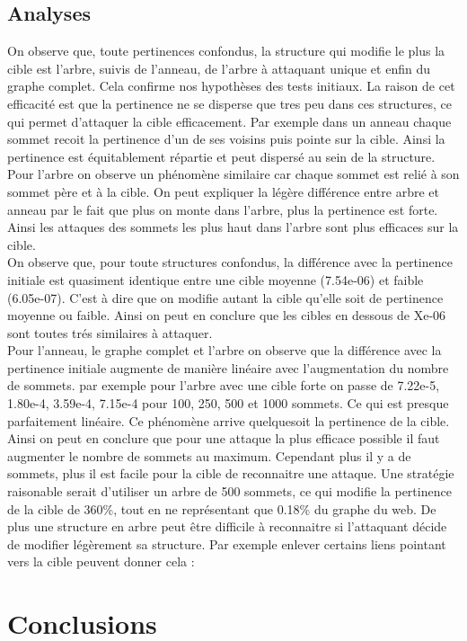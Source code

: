 \documentclass[a4paper,11pt]{article}
\begin{document}
	\subsection{Analyses}
		On observe que, toute pertinences confondus, la structure qui modifie le plus la cible est l'arbre, suivis de l'anneau, de l'arbre à attaquant unique et enfin du graphe complet.
		Cela confirme nos hypothèses des tests initiaux. La raison de cet efficacité est que la pertinence ne se disperse que tres peu dans ces structures, ce qui permet d'attaquer 
		la cible efficacement. Par exemple dans un anneau chaque sommet recoit la pertinence d'un de ses voisins puis pointe sur la cible. Ainsi la pertinence est équitablement répartie et peut dispersé au sein de la structure.
		Pour l'arbre on observe un phénomène similaire car chaque sommet est relié à son sommet père et à la cible. On peut expliquer la légère différence entre arbre et anneau par le fait 
		que plus on monte dans l'arbre, plus la pertinence est forte. Ainsi les attaques des sommets les plus haut dans l'arbre sont plus efficaces sur la cible.\\
		
		On observe que, pour toute structures confondus, la différence avec la pertinence initiale est quasiment identique entre une cible moyenne (7.54e-06) et faible (6.05e-07).
		C'est à dire que on modifie autant la cible qu'elle soit de pertinence moyenne ou faible. Ainsi on peut en conclure que les cibles en dessous de Xe-06 sont toutes trés similaires à attaquer.\\
		
		Pour l'anneau, le graphe complet et l'arbre on observe que la différence avec la pertinence initiale augmente de manière linéaire avec l'augmentation du nombre de sommets.
		par exemple pour l'arbre avec une cible forte on passe de 7.22e-5, 1.80e-4, 3.59e-4, 7.15e-4 pour 100, 250, 500 et 1000 sommets. Ce qui est presque parfaitement linéaire.
		Ce phénomène arrive quelquesoit la pertinence de la cible. Ainsi on peut en conclure que pour une attaque la plus efficace possible il faut augmenter le nombre de sommets au maximum.
		Cependant plus il y a de sommets, plus il est facile pour la cible de reconnaitre une attaque. Une stratégie raisonable serait d'utiliser un arbre de 500 sommets, 
		ce qui modifie la pertinence de la cible de 360\%, tout en ne représentant que 0.18\% du graphe du web. De plus une structure en arbre peut être difficile à reconnaitre si l'attaquant décide 
		de modifier légèrement sa structure. Par exemple enlever certains liens pointant vers la cible peuvent donner cela : 
	
\section{Conclusions}
\end{document}
